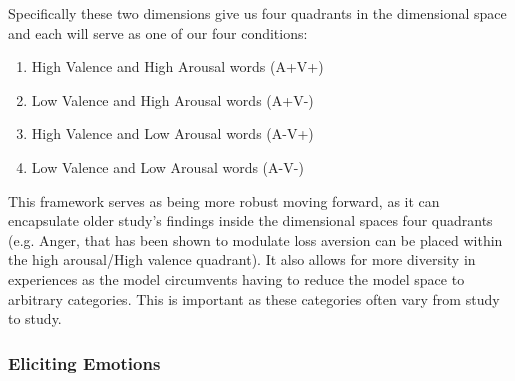 \documentclass{article}
\begin{document}
Specifically these two dimensions give us four quadrants in the dimensional space and each will serve as one of our four conditions:
\begin{enumerate}
    \item High Valence and High Arousal words (A+V+)
    \item Low Valence and High Arousal words (A+V-)
    \item High Valence and Low Arousal words (A-V+)
    \item Low Valence and Low Arousal words (A-V-)
\end{enumerate}
 
This framework serves as being more robust moving forward, as it can encapsulate older study’s findings inside the dimensional spaces four quadrants (e.g. Anger, that has been shown to modulate loss aversion can be placed within the high arousal/High valence quadrant). It also allows for more diversity in experiences as the model circumvents having to reduce the model space to arbitrary categories. This is important as these categories often vary from study to study.

    \subsubsection{Eliciting Emotions}
\end{document}
